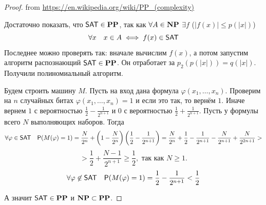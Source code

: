 \begin{proof}

from \href{https://en.wikipedia.org/wiki/PP_(complexity)#PP_compared_to_other_complexity_classes}{https://en.wikipedia.org/wiki/PP\_(complexity)}

Достаточно показать, что $\mathsf{SAT}\in\textbf{PP}$, так как $\forall A \in \textbf{NP}$ $\exists f$ ($|f(x)|\le p(|x|)$)
\[\forall x\quad x\in A\iff f(x)\in \mathsf{SAT}\]
Последнее можно проверять так: вначале вычислим $f(x)$, а потом запустим алгоритм распознающий $\mathsf{SAT}\in\textbf{PP}$. Он отработает за $p_2(p(|x|))=q(|x|)$. Получили полиномиальный алгоритм.

Будем строить машину $M$. Пусть на вход дана формула $\varphi(x_1,\ldots,x_n)$. Проверим на $n$ случайных битах $\varphi(x_1,\ldots,x_n)=1$ и если это так, то вернём $1$. Иначе вернем $1$ с вероятностью $\frac{1}{2}-\frac{1}{2^{n+1}}$ и $0$ с вероятностью $\frac{1}{2}+\frac{1}{2^{n+1}}$. Пусть у формулы всего $N$ выполняющих наборов. Тогда
\[\forall \varphi\in\mathsf{SAT}\quad \mathsf{P}(M(\varphi)=1) = \frac{N}{2^n} + \left(1-\frac{N}{2^n}\right)\left(\frac{1}{2}-\frac{1}{2^{n+1}}\right)=\frac{N}{2^n} + \frac{1}{2} - \frac{1}{2^{n+1}} - \frac{N}{2^{n+1}} + \frac{N}{2^{2n+1}} >
\]
\[
> \frac{1}{2} + \frac{N - 1}{2^{n+1}} \ge \frac{1}{2},\text{ так как $N \ge 1$.}
\]
\[\forall \varphi\not\in\mathsf{SAT}\quad \mathsf{P}(M(\varphi)=1)=\frac{1}{2} - \frac{1}{2^{n + 1}}<\frac{1}{2}\]

А значит $\mathsf{SAT}\in\textbf{PP}$ и $\textbf{NP}\subset\textbf{PP}$. 

\end{proof}
